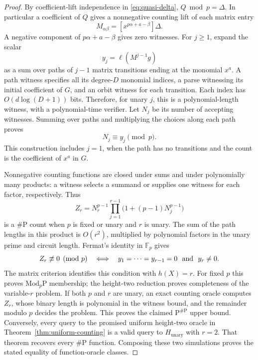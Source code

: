 \begin{proof}
By coefficient-lift independence in \eqref{eq:quasi-delta},
$Q\bmod p=\Delta$. In particular a coefficient of $Q$ gives a
nonnegative counting lift of each matrix entry
\[
 M_{\alpha\beta}=[x^{p\alpha+a-\beta}]\Delta.
\]
A negative component of $p\alpha+a-\beta$ gives zero witnesses.
For $j\ge1$, expand the scalar
\[
 y_j=\ell(M^{j-1}g)
\]
as a sum over paths of $j-1$ matrix transitions ending at the
monomial $x^a$. A path witness specifies all its degree-$D$
monomial indices, a parse witnessing its initial coefficient of
$G$, and an orbit witness for each transition. Each index has
$O(d\log(D+1))$ bits. Therefore, for unary $j$, this is a
polynomial-length witness, with a polynomial-time verifier.
Let $N_j$ be its number of accepting witnesses. Summing over paths
and multiplying the choices along each path proves
\[
 N_j\equiv y_j\pmod p.
\]
This construction includes $j=1$, when the path has no transitions
and the count is the coefficient of $x^a$ in $G$.

Nonnegative counting functions are closed under sums and under
polynomially many products: a witness selects a summand or supplies
one witness for each factor, respectively. Thus
\begin{equation}\label{eq:unary-count}
 Z_r=N_r^{p-1}\prod_{j=1}^{r-1}
       \bigl(1+(p-1)N_j^{p-1}\bigr)
\end{equation}
is a $\#\mathrm P$ count when $p$ is fixed or unary and $r$ is
unary. The sum of the path lengths in this product is $O(r^2)$,
multiplied by polynomial factors in the unary prime and circuit
length. Fermat's identity in $\mathbb F_p$ gives
\[
 Z_r\not\equiv0\pmod p
 \quad\Longleftrightarrow\quad
 y_1=\cdots=y_{r-1}=0\ \hbox{ and }\ y_r\ne0.
\]
The matrix criterion identifies this condition with $h(X)=r$.
For fixed $p$ this proves $\mathrm{Mod}_p\mathrm P$ membership;
the height-two reduction proves completeness of the variable-$r$
problem. If both $p$ and $r$ are unary, an exact counting oracle
computes $Z_r$, whose binary length is polynomial in the witness
bound, and the remainder modulo $p$ decides the problem. This
proves the claimed $\mathrm P^{\#\mathrm P}$ upper bound.
Conversely, every query to the promised uniform height-two oracle
in Theorem~\ref{thm:uniform-counting} is a valid query to
$H_{\mathrm{unary}}$ with $r=2$. That theorem recovers every
$\#\mathrm P$ function. Composing these two simulations proves
the stated equality of function-oracle classes.
\end{proof}

